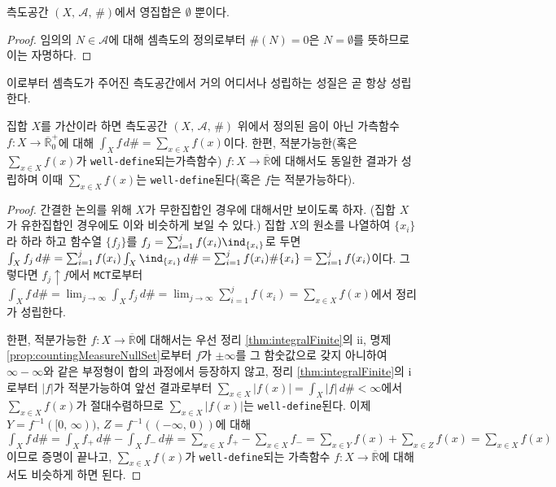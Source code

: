 \begin{proposition}\label{prop:countingMeasureNullSet}
    측도공간 $(X,\,\mathcal{A},\,\#)$에서 영집합은 $\emptyset$ 뿐이다.
\end{proposition}

\begin{proof}
    임의의 $N\in\mathcal{A}$에 대해 셈측도의 정의로부터 $\#(N)=0$은 $N=\emptyset$를 뜻하므로 이는 자명하다.
\end{proof}

이로부터 셈측도가 주어진 측도공간에서 거의 어디서나 성립하는 성질은 곧 항상 성립한다.

\begin{theorem}\label{thm:countingMeasrueInt}
    집합 $X$를 가산이라 하면 측도공간 $(X,\,\mathcal{A},\,\#)$ 위에서 정의된 음이 아닌 가측함수 $f:X\to\overline{\mathbb{R}}^+_0$에 대해 $\int_Xf\,d\#=\sum_{x\in X}f(x)$이다. 한편, 적분가능한(혹은 $\sum_{x\in X}f(x)$가 \texttt{well-define}되는\footnotemark 가측함수) $f:X\to\overline{\mathbb{R}}$에 대해서도 동일한 결과가 성립하며 이때 $\sum_{x\in X}f(x)$는 \texttt{well-define}된다(혹은 $f$는 적분가능하다).
\end{theorem}

\begin{proof}
    간결한 논의를 위해 $X$가 무한집합인 경우에 대해서만 보이도록 하자. (집합 $X$가 유한집합인 경우에도 이와 비슷하게 보일 수 있다.) 집합 $X$의 원소를 나열하여 $\{x_i\}$라 하라 하고 함수열 $\{f_j\}$를 $f_j=\sum_{i=1}^jf(x_i)\ind_{\{x_i\}}$로 두면 $\int_Xf_j\,d\#=\sum_{i=1}^jf(x_i)\int_X\ind_{\{x_i\}}\,d\#=\sum_{i=1}^jf(x_i)\#\{x_i\}=\sum_{i=1}^jf(x_i)$이다. 그렇다면 $f_j\uparrow f$에서 \texttt{MCT}로부터 $\int_Xf\,d\#=\lim_{j\to\infty}\int_Xf_j\,d\#=\lim_{j\to\infty}\sum_{i=1}^jf(x_i)=\sum_{x\in X}f(x)$에서 정리가 성립한다.
    
    한편, 적분가능한 $f:X\to\overline{\mathbb{R}}$에 대해서는 우선 정리 \ref{thm:integralFinite}의 ii, 명제 \ref{prop:countingMeasureNullSet}로부터 $f$가 $\pm\infty$를 그 함숫값으로 갖지 아니하여 $\infty-\infty$와 같은 부정형이 합의 과정에서 등장하지 않고, 정리 \ref{thm:integralFinite}의 i로부터 $|f|$가 적분가능하여 앞선 결과로부터 $\sum_{x\in X}|f(x)|=\int_X|f|\,d\#<\infty$에서 $\sum_{x\in X}f(x)$가 절대수렴하므로 $\sum_{x\in X}|f(x)|$는 \texttt{well-define}된다. 이제 $Y=f^{-1}([0,\,\infty)),\,Z=f^{-1}((-\infty,\,0))$에 대해
    $\int_Xf\,d\#=\int_Xf_+\,d\#-\int_Xf_-\,d\#=\sum_{x\in X}f_+-\sum_{x\in X}f_-=\sum_{x\in Y}f(x)+\sum_{x\in Z}f(x)=\sum_{x\in X}f(x)$이므로 증명이 끝나고, $\sum_{x\in X}f(x)$가 \texttt{well-define}되는 가측함수 $f:X\to\overline{\mathbb{R}}$에 대해서도 비슷하게 하면 된다.
\end{proof}

